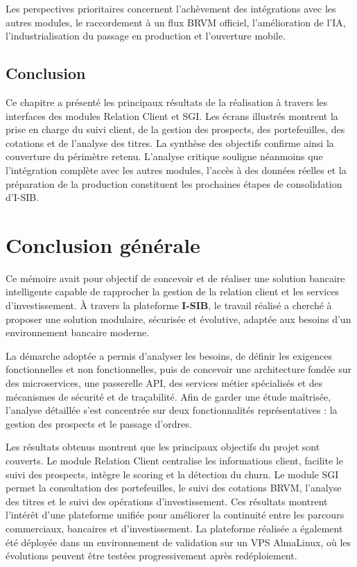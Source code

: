 \documentclass[a4paper,12pt]{report}
\begin{document}
Les perspectives prioritaires concernent l'achèvement des intégrations avec les
autres modules, le raccordement à un flux BRVM officiel, l'amélioration de l'IA,
l'industrialisation du passage en production et l'ouverture mobile.

\section*{Conclusion}
{}

Ce chapitre a présenté les principaux résultats de la réalisation à travers les
interfaces des modules Relation Client et SGI. Les écrans illustrés montrent la
prise en charge du suivi client, de la gestion des prospects, des portefeuilles,
des cotations et de l'analyse des titres. La synthèse des objectifs confirme
ainsi la couverture du périmètre retenu. L'analyse critique souligne néanmoins
que l'intégration complète avec les autres modules, l'accès à des données
réelles et la préparation de la production constituent les prochaines étapes de
consolidation d'I-SIB.

\chapter*{Conclusion générale}
{}

Ce mémoire avait pour objectif de concevoir et de réaliser une solution bancaire
intelligente capable de rapprocher la gestion de la relation client et les services
d'investissement. À travers la plateforme \textbf{I-SIB}, le travail réalisé a
cherché à proposer une solution modulaire, sécurisée et évolutive, adaptée aux
besoins d'un environnement bancaire moderne.

La démarche adoptée a permis d'analyser les besoins, de définir les exigences
fonctionnelles et non fonctionnelles, puis de concevoir une architecture fondée
sur des microservices, une passerelle API, des services métier spécialisés et des
mécanismes de sécurité et de traçabilité. Afin de garder une étude maîtrisée,
l'analyse détaillée s'est concentrée sur deux fonctionnalités représentatives :
la gestion des prospects et le passage d'ordres.

Les résultats obtenus montrent que les principaux objectifs du projet sont
couverts. Le module Relation Client centralise les informations client, facilite
le suivi des prospects, intègre le scoring et la détection du churn. Le module
SGI permet la consultation des portefeuilles, le suivi des cotations BRVM,
l'analyse des titres et le suivi des opérations d'investissement. Ces résultats
montrent l'intérêt d'une plateforme unifiée pour améliorer la continuité entre
les parcours commerciaux, bancaires et d'investissement. La plateforme réalisée
a également été déployée dans un environnement de validation sur un VPS
AlmaLinux, où les évolutions peuvent être testées progressivement après
redéploiement.
\end{document}
